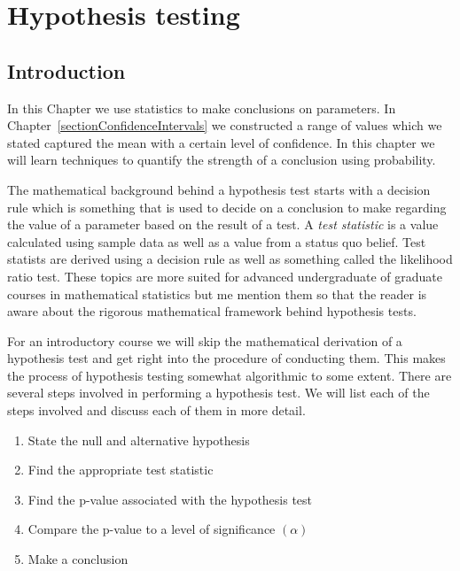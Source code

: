 \chapter{Hypothesis testing}
\label{hypothesisTesting}
\label{sectionHypothesisTesting}

\section{Introduction}
\label{hypothesisTesting}


In this Chapter we use statistics to make conclusions on parameters. 
In Chapter~\ref{sectionConfidenceIntervals} we constructed a range of values which we stated captured the mean with a certain level of confidence.
In this chapter we will learn techniques to quantify the strength of a conclusion using probability.


The mathematical background behind a hypothesis test starts with a decision rule which is
something that is used to decide on a conclusion to make regarding the value of a parameter based on the result of a test.
A \emph{test statistic} is a value calculated using sample data as well as a
value from a status quo belief. 
Test statists are derived using a decision rule as well as something called the
likelihood ratio test.
These topics are more suited for advanced undergraduate of graduate courses in mathematical statistics but 
me mention them so that the reader is aware about the rigorous mathematical framework behind hypothesis tests. 

For an introductory course we will skip the mathematical derivation of a hypothesis test and
get right into the procedure of conducting them.
This makes the process of hypothesis testing somewhat algorithmic to some extent.
There are several steps involved in performing a hypothesis test.
We will list each of the steps involved and discuss each of them in more detail.


\begin{enumerate}
\item	State the null and alternative hypothesis
\item	Find the appropriate test statistic
\item	Find the p-value associated with the hypothesis test
\item	Compare the p-value to a level of significance $(\alpha)$
\item	Make a conclusion
\end{enumerate}

